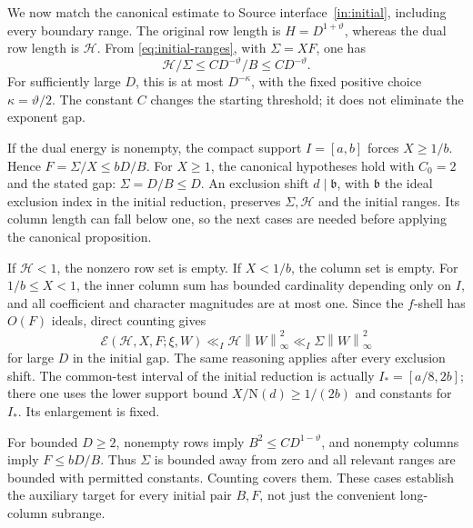\documentclass[11pt]{article}
\numberwithin{equation}{section}
\theoremstyle{definition}
\theoremstyle{remark}
\newcommand{\E}{\mathcal E}
\newcommand{\N}{\mathrm N}
\newcommand{\norm}[1]{\left\|#1\right\|}
\begin{document}
We now match the canonical estimate to
Source interface~\ref{in:initial}, including every boundary range.
The original row length is \(H=D^{1+\vartheta}\), whereas the
dual row length is \(\mathcal H\). From
\eqref{eq:initial-ranges}, with \(\Sigma=XF\), one has
\begin{equation}\label{eq:initial-gap-final}
 \mathcal H/\Sigma\le CD^{-\vartheta}/B\le CD^{-\vartheta}.
\end{equation}
For sufficiently large \(D\), this is at most
\(D^{-\kappa}\), with the fixed positive choice
\(\kappa=\vartheta/2\). The constant \(C\) changes the
starting threshold; it does not eliminate the exponent gap.

If the dual energy is nonempty, the compact support \(I=[a,b]\)
forces \(X\ge1/b\). Hence \(F=\Sigma/X\le bD/B\).
For \(X\ge1\), the canonical hypotheses hold with \(C_0=2\)
and the stated gap: \(\Sigma=D/B\le D\).
An exclusion shift \(d\mid\mathfrak b\), with \(\mathfrak b\) the
ideal exclusion index in the initial reduction, preserves
\(\Sigma,\mathcal H\) and the initial ranges. Its column length
can fall below one, so the next cases are needed before applying
the canonical proposition.

If \(\mathcal H<1\), the nonzero row set is empty. If \(X<1/b\),
the column set is empty. For \(1/b\le X<1\), the inner column sum
has bounded cardinality depending only on \(I\), and all coefficient
and character magnitudes are at most one. Since the \(f\)-shell has
\(O(F)\) ideals, direct counting gives
\[
 \E(\mathcal H,X,F;\xi,W)\ll_I
       \mathcal H\norm{W}_\infty^2
 \ll_I\Sigma\norm{W}_\infty^2
\]
for large \(D\) in the initial gap. The same reasoning applies
after every exclusion shift. The common-test interval of the
initial reduction is actually \(I_*=[a/8,2b]\);
there one uses the lower support bound \(X/\N(d)\ge1/(2b)\)
and constants for \(I_*\). Its enlargement is fixed.

For bounded \(D\ge2\), nonempty rows imply
\(B^2\le CD^{1-\vartheta}\), and nonempty columns imply
\(F\le bD/B\). Thus \(\Sigma\) is bounded away from zero and
all relevant ranges are bounded with permitted constants.
Counting covers them. These cases establish the auxiliary target
for every initial pair \(B,F\), not just the convenient long-column
subrange.
\end{document}
